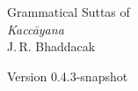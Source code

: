 \begin{titlepage}
\setcounter{page}{1}
{\noindent\fontsize{26pt}{26pt}\upshape Grammatical Suttas of}\\[2\baselineskip]
{\noindent\fontsize{46pt}{46pt}\itshape Kaccāyana}\\[8\baselineskip]
{\LARGE J.\,R. Bhaddacak}\par
{}
{\noindent\ttfamily Version 0.4.3-snapshot}
\end{titlepage}
\endinput
